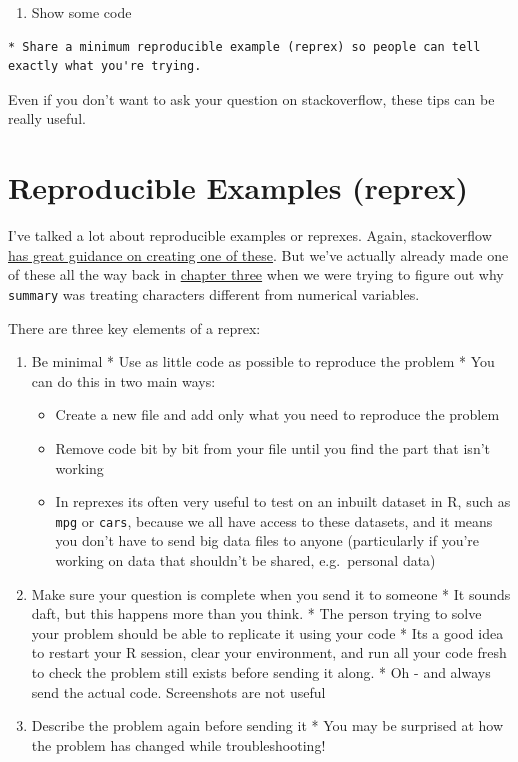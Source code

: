 \documentclass[
]{book}
\providecommand{\tightlist}{%
  \setlength{\itemsep}{0pt}\setlength{\parskip}{0pt}}
\begin{document}
\begin{enumerate}
\def\labelenumi{\arabic{enumi}.}
\setcounter{enumi}{2}
\tightlist
\item
  Show some code
\end{enumerate}

\begin{verbatim}
* Share a minimum reproducible example (reprex) so people can tell exactly what you're trying. 
\end{verbatim}

Even if you don't want to ask your question on stackoverflow, these tips can be really useful.

\hypertarget{trouble_reprex}{%
\section{Reproducible Examples (reprex)}\label{trouble_reprex}}

I've talked a lot about reproducible examples or reprexes. Again, stackoverflow \href{https://stackoverflow.com/help/minimal-reproducible-example}{has great guidance on creating one of these}. But we've actually already made one of these all the way back in \protect\hyperlink{ex_createdata}{chapter three} when we were trying to figure out why \texttt{summary} was treating characters different from numerical variables.

There are three key elements of a reprex:

\begin{enumerate}
\def\labelenumi{\arabic{enumi}.}
\item
  Be minimal
  * Use as little code as possible to reproduce the problem
  * You can do this in two main ways:

  \begin{itemize}
  \tightlist
  \item
    Create a new file and add only what you need to reproduce the problem
  \item
    Remove code bit by bit from your file until you find the part that isn't working
  \item
    In reprexes its often very useful to test on an inbuilt dataset in R, such as \texttt{mpg} or \texttt{cars}, because we all have access to these datasets, and it means you don't have to send big data files to anyone (particularly if you're working on data that shouldn't be shared, e.g.~personal data)
  \end{itemize}
\item
  Make sure your question is complete when you send it to someone
  * It sounds daft, but this happens more than you think.
  * The person trying to solve your problem should be able to replicate it using your code
  * Its a good idea to restart your R session, clear your environment, and run all your code fresh to check the problem still exists before sending it along.
  * Oh - and always send the actual code. Screenshots are not useful
\item
  Describe the problem again before sending it
  * You may be surprised at how the problem has changed while troubleshooting!
\end{enumerate}
\end{document}
